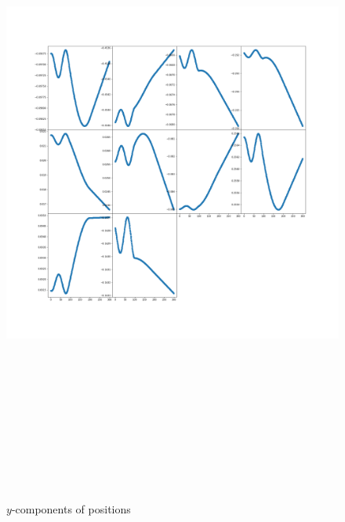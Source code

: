 \documentclass[12pt]{article}
\begin{document}
	\begin{figure}[H]
		\includegraphics[width=\linewidth, height=22cm]{subpsy3.png} \caption{$y$-components of positions} \label{subpsy3}
	\end{figure}
\end{document}
